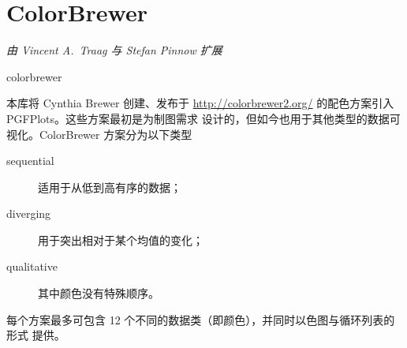 {{%
}}

\section{ColorBrewer}
\def\pgfplotsmanualcurlibrary{colormaps}

{\emph{由 Vincent A.\ Traag 与 Stefan Pinnow 扩展}}

\begin{pgfplotslibrary}{colorbrewer}

本库将 Cynthia Brewer 创建、发布于
\url{http://colorbrewer2.org/} 的配色方案引入 PGFPlots。这些方案最初是为制图需求
设计的，但如今也用于其他类型的数据可视化。ColorBrewer 方案分为以下类型
%
\begin{description}
    \item[sequential] 适用于从低到高有序的数据；
    \item[diverging] 用于突出相对于某个均值的变化；
    \item[qualitative] 其中颜色没有特殊顺序。
\end{description}
%
每个方案最多可包含 12 个不同的数据类（即颜色），并同时以色图与循环列表的形式
提供。

{%
\centering

}
\end{pgfplotslibrary}
